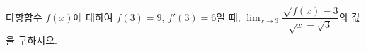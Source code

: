 다항함수 $f(x)$에 대하여 $f(3)=9$, $f'(3)=6$일 때, $\displaystyle\lim_{x\to 3}\dfrac{\sqrt{f(x)}-3}{\sqrt{x}-\sqrt{3}}$의 값을 구하시오.

